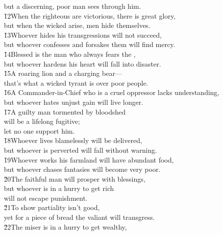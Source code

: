 \begin{poetry}
\poemll    but a discerning, poor man sees through him. \\
\poeml \v{12}When the righteous are victorious, there is great glory, \\
\poemll    but when the wicked arise, men hide themselves. \\
\poeml \v{13}Whoever hides his transgressions will not succeed, \\
\poemll    but whoever confesses and forsakes them will find mercy. \\
\poeml \v{14}Blessed is the man who always fears the , \\
\poemll    but whoever hardens his heart will fall into disaster. \\
\poeml \v{15}A roaring lion and a charging bear--- \\
\poemll    that's what a wicked tyrant is over poor people. \\
\poeml \v{16}A Commander-in-Chief who is a cruel oppressor lacks understanding, \\
\poemll    but whoever hates unjust gain will live longer. \\
\poeml \v{17}A guilty man tormented by bloodshed \\
\poemll    will be a lifelong fugitive; \\
\poemlll       let no one support him. \\
\poeml \v{18}Whoever lives blamelessly will be delivered, \\
\poemll    but whoever is perverted will fall without warning. \\
\poeml \v{19}Whoever works his farmland will have abundant food, \\
\poemll    but whoever chases fantasies will become very poor. \\
\poeml \v{20}The faithful man will prosper with blessings, \\
\poemll    but whoever is in a hurry to get rich \\
\poemlll       will not escape punishment. \\
\poeml \v{21}To show partiality isn't good, \\
\poemll    yet for a piece of bread the valiant will transgress. \\
\poeml \v{22}The miser is in a hurry to get wealthy, \\

\end{poetry}
